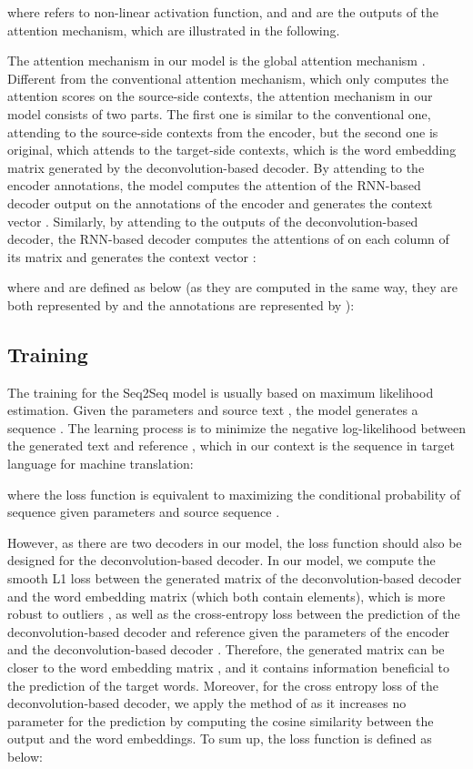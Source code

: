 \documentclass[11pt]{article}
\begin{document}
\begin{CJK}{UTF8}{gbsn}
where  refers to non-linear activation function, and  and  are the outputs of the attention mechanism, which are illustrated in the following.

The attention mechanism in our model is the global attention mechanism \citep{stanfordattention}. Different from the conventional attention mechanism, which only computes the attention scores on the source-side contexts, the attention mechanism in our model consists of two parts. The first one is similar to the conventional one, attending to the source-side contexts from the encoder, but the second one is original, which attends to the target-side contexts, which is the word embedding matrix generated by the deconvolution-based decoder. By attending to the encoder annotations, the model computes the attention  of the RNN-based decoder output  on the annotations of the encoder  and generates the context vector . Similarly, by attending to the outputs of the deconvolution-based decoder, the RNN-based decoder computes the attentions of  on each column  of its matrix  and generates the context vector :

where  and  are defined as below (as they are computed in the same way, they are both represented by  and the annotations are represented by ):


\subsection{Training}

The training for the Seq2Seq model is usually based on maximum likelihood estimation. Given the parameters  and source text , the model generates a sequence . The learning process is to minimize the negative log-likelihood between the generated text  and reference , which in our context is the sequence in target language for machine translation:

where the loss function is equivalent to maximizing the conditional probability of sequence  given parameters  and source sequence .

However, as there are two decoders in our model, the loss function should also be designed for the deconvolution-based decoder. In our model, we compute the smooth L1 loss between the generated matrix of the deconvolution-based decoder  and the word embedding matrix  (which both contain  elements), which is more robust to outliers \citep{fastRCNN}, as well as the cross-entropy loss between the prediction of the deconvolution-based decoder  and reference  given the parameters of the encoder and the deconvolution-based decoder . Therefore, the generated matrix  can be closer to the word embedding matrix , and it contains information beneficial to the prediction of the target words. Moreover, for the cross entropy loss of the deconvolution-based decoder, we apply the method of \citet{wean} as it increases no parameter for the prediction by computing the cosine similarity between the output and the word embeddings. To sum up, the loss function is defined as below:


\end{CJK}
\end{document}
